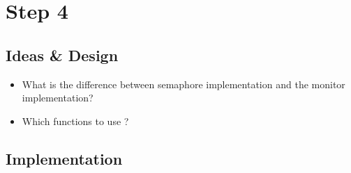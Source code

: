 \section{Step 4}

\subsection{Ideas \& Design}

\begin{itemize}
\item What is the difference between semaphore implementation and the monitor implementation?
\item Which functions to use ?

\end{itemize}

\subsection{Implementation}

